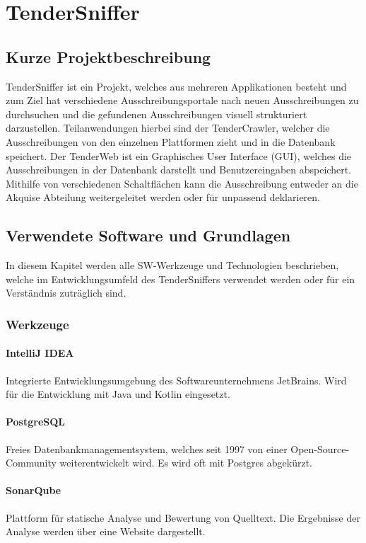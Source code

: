 \chapter{TenderSniffer}

\section{Kurze Projektbeschreibung}
TenderSniffer ist ein Projekt, welches aus mehreren Applikationen besteht und zum Ziel hat verschiedene
Ausschreibungsportale nach neuen Ausschreibungen zu durchsuchen und die gefundenen Ausschreibungen visuell strukturiert
darzustellen. Teilanwendungen hierbei sind der TenderCrawler, welcher die Ausschreibungen von den einzelnen Plattformen
zieht und in die Datenbank speichert. Der TenderWeb ist ein Graphisches User Interface (GUI), welches die
Ausschreibungen in der Datenbank darstellt und Benutzereingaben abspeichert. Mithilfe von verschiedenen Schaltflächen
kann die Ausschreibung entweder an die Akquise Abteilung weitergeleitet werden oder für unpassend deklarieren.

\section{Verwendete Software und Grundlagen}
In diesem Kapitel werden alle SW-Werkzeuge und Technologien beschrieben, welche im Entwicklungsumfeld des TenderSniffers
verwendet werden oder für ein Verständnis zuträglich sind.

\subsection{Werkzeuge}

\subsubsection{IntelliJ IDEA}
Integrierte Entwicklungsumgebung des Softwareunternehmens JetBrains. Wird für die Entwicklung mit Java und Kotlin
eingesetzt. 

\subsubsection{PostgreSQL}
Freies Datenbankmanagementsystem, welches seit 1997 von einer Open-Source-Community weiterentwickelt wird. Es wird oft
mit Postgres abgekürzt.

\subsubsection{SonarQube}
Plattform für statische Analyse und Bewertung von Quelltext. Die Ergebnisse der Analyse werden über eine Website dargestellt.

